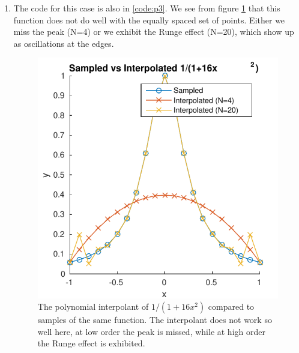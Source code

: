\documentclass{article}
\begin{document}
\begin{enumerate}
\item
The code for this case is also in \ref{code:p3}.
We see from figure \ref{fig:p3n20} that this function does not do well with the equally spaced set of points.
Either we miss the peak (N=4) or we exhibit the Runge effect (N=20), which show up as oscillations at the edges.
\begin{figure}[!ht]
\centering
\includegraphics[scale=1]{p3n20.pdf}
\caption{The polynomial interpolant of $1 / (1+16x^2)$ compared to samples of the same function. The interpolant does not work so well here, at low order the peak is missed, while at high order the Runge effect is exhibited.}
\label{fig:p3n20}
\end{figure}


\end{enumerate}
\end{document}
